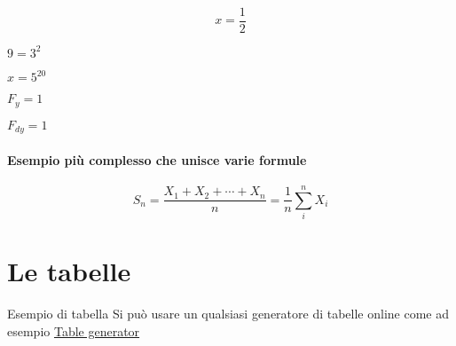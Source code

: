 \documentclass[]{article}
\begin{document}
    \begin{equation}
        x= \frac{1}{2}
    \end{equation}
    
    $9 = 3^2$

    $x = 5^{20}$

    $F_y = 1$

    $F_{dy} = 1$

    \paragraph{Esempio più complesso che unisce varie formule}
    \begin{equation}
        S_n = \frac{X_1 + X_2 + \cdots + X_n}{n} = \frac{1}{n} \sum_{i}^{n} X_i
    \end{equation}

    \section{Le tabelle}
    Esempio di tabella
    Si può usare un qualsiasi generatore di tabelle online come ad esempio \href{https://www.tablesgenerator.com/}{Table generator}
    
\end{document}
